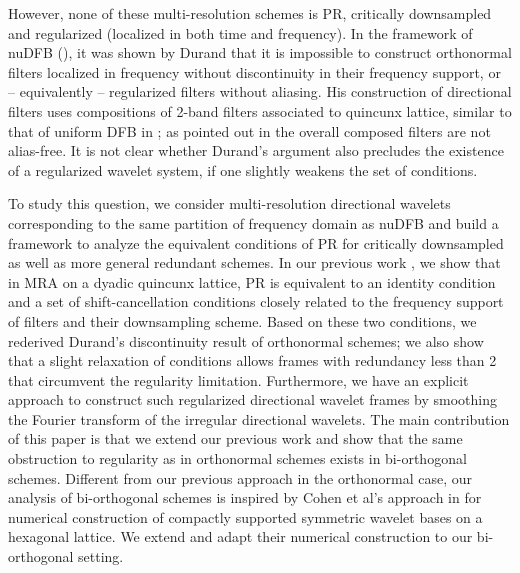 However, none of these multi-resolution schemes is PR, critically downsampled and regularized (localized in both time and frequency). In the framework of nuDFB (\cite{nuDFB05}), it was shown by Durand \cite{durand2007} that it is impossible to construct orthonormal filters localized in frequency without discontinuity in their frequency support, or -- equivalently -- regularized filters without aliasing. His construction of directional filters uses compositions of 2-band filters associated to quincunx lattice, similar to that of uniform DFB in \cite{nuDFB05}; as pointed out in \cite{nuDFB05} the overall composed filters are not alias-free. It is not clear whether Durand's argument also precludes the existence of a regularized wavelet system, if one slightly weakens the set of conditions.

To study this question, we consider multi-resolution directional wavelets corresponding to the same partition of frequency domain as nuDFB and build a framework to analyze the equivalent conditions of PR for critically downsampled as well as more general redundant schemes. In our previous work \cite{yin2014orthshear}, we show that in MRA on a dyadic quincunx lattice, PR is equivalent to an identity condition and a set of shift-cancellation conditions closely related to the frequency support of filters and their downsampling scheme. Based on these two conditions, we rederived Durand's discontinuity result of orthonormal schemes; we also show that a slight relaxation of conditions allows frames with redundancy less than 2 that circumvent the regularity limitation. Furthermore, we have an explicit approach to construct such regularized directional wavelet frames by smoothing the Fourier transform of the irregular directional wavelets.
The main contribution of this paper is that we extend our previous work and show that the same obstruction to regularity as in orthonormal schemes exists in bi-orthogonal schemes. Different from our previous approach in the orthonormal case, our analysis of bi-orthogonal schemes is inspired by Cohen et al's approach in \cite{cohen1993compactly} for numerical construction of compactly supported symmetric wavelet bases on a hexagonal lattice. We extend and adapt their numerical construction to our bi-orthogonal setting.

